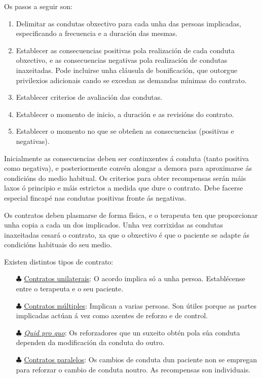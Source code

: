 \documentclass[a4paper,11pt]{article}
\begin{document}
Os pasos a seguir son:
\begin{enumerate}
	\item Delimitar as condutas obxectivo para cada unha das persoas implicadas, especificando a 
	frecuencia e a duración das mesmas. 
	\item Establecer as consecuencias positivas pola realización de cada conduta obxectivo, e as 
	consecuencias negativas pola realización de condutas inaxeitadas. Pode incluirse unha cláusula de 
	bonificación, que outorgue privilexios adicionais cando se excedan as demandas mínimas do 
	contrato.
	\item Establecer criterios de avaliación das condutas.
	\item Establecer o momento de inicio, a duración e as revisións do contrato.
	\item Establecer o momento no que se obteñen as consecuencias (positivas e negativas).
\end{enumerate}

Inicialmente as consecuencias deben ser continxentes á conduta (tanto positiva como negativa), e posteriormente convén alongar a demora para aproximarse ás condicións do medio habitual. Os criterios para obter recompensas serán máis laxos ó principio e máis estrictos a medida que dure o contrato. Debe facerse especial fincapé nas condutas positivas fronte ás negativas. 

Os contratos deben plasmarse de forma física, e o terapeuta ten que proporcionar unha copia a cada un dos implicados. Unha vez corrixidas as condutas inaxeitadas cesará o contrato, xa que o obxectivo é que o paciente se adapte ás condicións habituais do seu medio. 

Existen distintos tipos de contrato:
\begin{itemize}
	\item[$\clubsuit$] \underline{Contratos unilaterais}: O acordo implica só a unha persoa. 
	Establécense entre o terapeuta e o seu paciente.
	\item[$\clubsuit$] \underline{Contratos múltiples}: Implican a varias persoas. Son útiles porque 
	as partes implicadas actúan á vez como axentes de reforzo e de control.
	\item[$\clubsuit$] \underline{\textit{Quid pro quo}}: Os reforzadores que un suxeito obtén pola 
	súa conduta dependen da modificación da conduta do outro.
	\item[$\clubsuit$] \underline{Contratos paralelos}: Os cambios de conduta dun paciente non se 
	empregan para reforzar o cambio de conduta noutro. As recompensas son individuais. 
\end{itemize}
\end{document}
